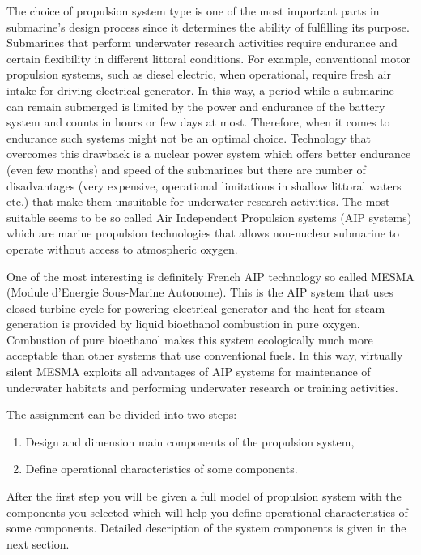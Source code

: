 \documentclass{article}
\begin{document}
	The choice of propulsion system type is one of the most important parts in submarine’s design process since it determines the ability of fulfilling its purpose. Submarines that perform underwater research activities require endurance and certain flexibility in different littoral conditions. For example, conventional motor propulsion systems, such as diesel electric, when operational, require fresh air intake for driving electrical generator. In this way, a period while a submarine can remain submerged is limited by the power and endurance of the battery system and counts in hours or few days at most. Therefore, when it comes to endurance such systems might not be an optimal choice. Technology that overcomes this drawback is a nuclear power system which offers better endurance (even few months) and speed of the submarines but there are number of disadvantages (very expensive, operational limitations in shallow littoral waters etc.) that make them unsuitable for underwater research activities. The most suitable seems to be so called Air Independent Propulsion systems (AIP systems) which are marine propulsion technologies that allows non-nuclear submarine to operate without access to atmospheric oxygen. 
	
	One of the most interesting is definitely French AIP technology so called 
	MESMA (Module d'Energie Sous-Marine Autonome). This is the AIP system that 
	uses closed-turbine cycle for powering electrical generator and the heat 
	for steam generation is provided by liquid bioethanol combustion in pure 
	oxygen. Combustion of pure bioethanol makes this system ecologically much 
	more acceptable than other systems that use conventional fuels. In this 
	way, virtually silent MESMA exploits all advantages of AIP systems for 
	maintenance of underwater habitats and performing underwater research or 
	training activities.
	
	
	The assignment can be divided into two steps: 
	
	\begin{enumerate}
		\item Design and dimension main components of the propulsion system,
		\item Define operational characteristics of some components.
	\end{enumerate}

	After the first step you will be given a full model of propulsion system with the components you selected which will help you define operational characteristics of some components.
	Detailed description of the system components is given in the next section.
	
\end{document}
